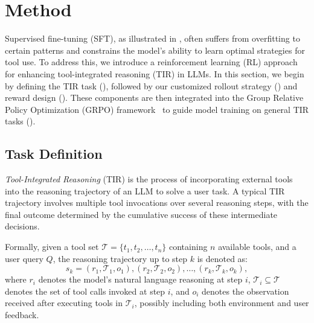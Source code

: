 \section{Method}

Supervised fine-tuning (SFT), as illustrated in , often suffers from overfitting to certain patterns and constrains the model’s ability to learn optimal strategies for tool use. To address this, we introduce a reinforcement learning (RL) approach for enhancing tool-integrated reasoning (TIR) in LLMs. In this section, we begin by defining the TIR task (), followed by our customized rollout strategy () and reward design (). These components are then integrated into the Group Relative Policy Optimization (GRPO) framework~\cite{shao2024deepseekmath} to guide model training on general TIR tasks ().

\subsection{Task Definition}
\label{sec:task_definition}
\textit{Tool-Integrated Reasoning} (TIR) is the process of incorporating external tools into the reasoning trajectory of an LLM to solve a user task. A typical TIR trajectory involves multiple tool invocations over several reasoning steps, with the final outcome determined by the cumulative success of these intermediate decisions.

Formally, given a tool set \( \mathcal{T} = \{ t_1, t_2, \ldots, t_n \} \) containing \( n \) available tools, and a user query \( Q \), the reasoning trajectory up to step \( k \) is denoted as:
\[
s_k = \left( r_1, \mathcal{T}_1, o_1 \right), \left( r_2, \mathcal{T}_2, o_2 \right), \ldots, \left( r_k, \mathcal{T}_k, o_k \right),
\]
where \( r_i \) denotes the model's natural language reasoning at step \( i \), \( \mathcal{T}_i \subseteq \mathcal{T} \) denotes the set of tool calls invoked at step \( i \), and \( o_i \) denotes the observation received after executing tools in \( \mathcal{T}_i \), possibly including both environment and user feedback.

